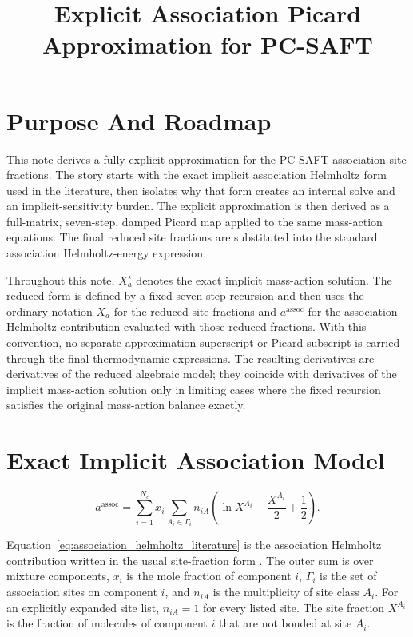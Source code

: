 \documentclass[12pt,letterpaper]{article}
\title{Explicit Association Picard Approximation for PC-SAFT}
\author{}
\date{}
\newcommand{\assoc}{\mathrm{assoc}}
\begin{document}
\maketitle

\section{Purpose And Roadmap}

This note derives a fully explicit approximation for the PC-SAFT association
site fractions. The story starts with the exact implicit association Helmholtz
form used in the literature, then isolates why that form creates an internal
solve and an implicit-sensitivity burden. The explicit approximation is then
derived as a full-matrix, seven-step, damped Picard map applied to the same
mass-action equations. The final reduced site fractions are substituted into
the standard association Helmholtz-energy expression.

Throughout this note, \(X_a^\star\) denotes the exact implicit mass-action
solution. The reduced form is defined by a fixed seven-step recursion and then
uses the ordinary notation \(X_a\) for the reduced site fractions and
\(a^\assoc\) for the association Helmholtz contribution evaluated with those
reduced fractions. With this convention, no separate approximation superscript
or Picard subscript is carried through the final thermodynamic expressions. The
resulting derivatives are derivatives of the reduced algebraic model; they
coincide with derivatives of the implicit mass-action solution only in limiting
cases where the fixed recursion satisfies the original mass-action balance
exactly.

\section{Exact Implicit Association Model}

\begin{equation}
    a^\assoc =
    \sum_{i=1}^{N_c} x_i
    \sum_{A_i\in\Gamma_i} n_{iA}
    \left(
        \ln X^{A_i}
        - \frac{X^{A_i}}{2}
        + \frac{1}{2}
    \right).
    \tag{4}
    \label{eq:association_helmholtz_literature}
\end{equation}
\setcounter{equation}{4}

Equation~\eqref{eq:association_helmholtz_literature} is the association
Helmholtz contribution written in the usual site-fraction form
\cite{Chapman1990,Huang1990,Gross2002}. The outer sum is over mixture
components, \(x_i\) is the mole fraction of component \(i\), \(\Gamma_i\) is
the set of association sites on component \(i\), and \(n_{iA}\) is the
multiplicity of site class \(A_i\). For an explicitly expanded site list,
\(n_{iA}=1\) for every listed site. The site fraction \(X^{A_i}\) is the
fraction of molecules of component \(i\) that are not bonded at site \(A_i\).
\end{document}
